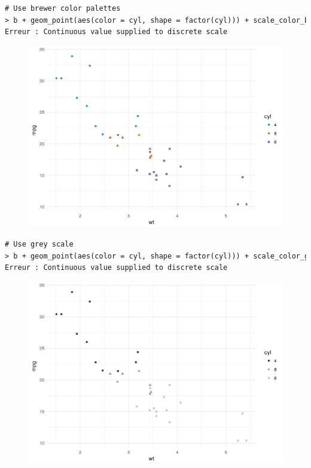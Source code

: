 \begin{lstlisting}[language=html]
# Use brewer color palettes
> b + geom_point(aes(color = cyl, shape = factor(cyl))) + scale_color_brewer(palette = "Dark2") + theme_minimal()
Erreur : Continuous value supplied to discrete scale
\end{lstlisting}
\begin{figure}[H]\begin{center}\includegraphics[scale=1 ]{ilu/bg43.png}\end{center}\end{figure}
\begin{lstlisting}[language=html]
# Use grey scale
> b + geom_point(aes(color = cyl, shape = factor(cyl))) + scale_color_grey() + theme_minimal()
Erreur : Continuous value supplied to discrete scale
\end{lstlisting}
\begin{figure}[H]\begin{center}\includegraphics[scale=1 ]{ilu/bg44.png}\end{center}\end{figure}

